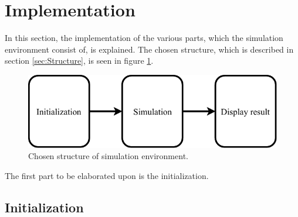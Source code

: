 \section{Implementation}\label{sec:implementation}

In this section, the implementation of the various parts, which the simulation environment consist of, is explained. The chosen structure, which is described in section \ref{sec:Structure}, is seen in figure \ref{fig:Basic_implementation}. 

\begin{figure}[H]
\centering
\includegraphics[width=0.75 \textwidth]{report/simulation/pictures/Basic_implementation.pdf}
\caption{Chosen structure of simulation environment.}
\label{fig:Basic_implementation}
\end{figure}

The first part to be elaborated upon is the initialization.

 \subsection*{Initialization}

